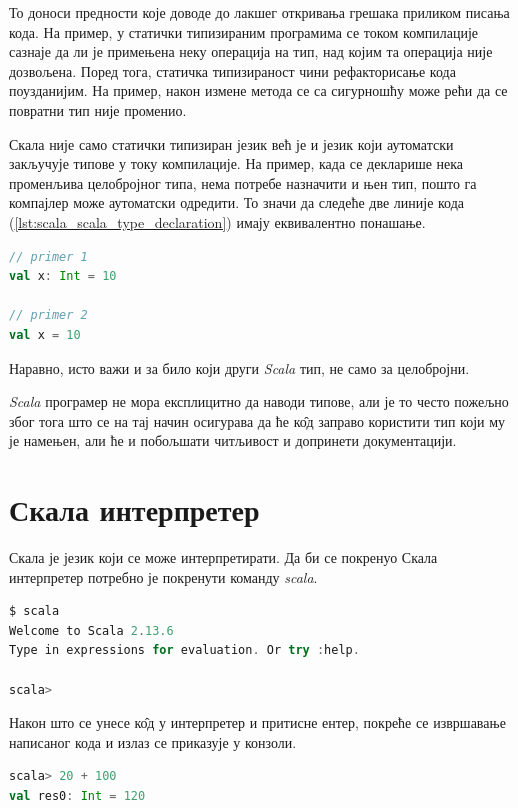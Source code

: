 \documentclass[12pt,oneside]{memoir}
\begin{document}
То доноси предности које доводе до лакшег откривања грешака приликом писања кода. На пример, у статички типизираним програмима се током компилације сазнаје да ли је примењена неку операција на тип, над којим та операција није дозвољена. Поред тога, статичка типизираност чини рефакторисање кода поузданијим. На пример, након измене метода се са сигурношћу може рећи да се повратни тип није променио. \cite{scala_prog}

Скала није само статички типизиран језик већ је и језик који аутоматски закључује типове у току компилације. На пример, када се декларише нека променљива целобројног типа, нема потребе назначити и њен тип, пошто га компајлер може аутоматски одредити. То значи да следеће две линије кода (\ref{lst:scala_scala_type_declaration}) имају еквивалентно понашање.

\begin{lstlisting}[caption={Декларација типова}, language=Scala, label={lst:scala_scala_type_declaration}]
// primer 1
val x: Int = 10

// primer 2
val x = 10
\end{lstlisting}

Наравно, исто важи и за било који други \textit{Scala} тип, не само за целобројни.

\textit{Scala} програмер не мора експлицитно да наводи типове, али је то  често пожељно због тога што се на тај начин осигурава да ће к\^{о}д заправо користити тип који му је намењен, али ће и побољшати читљивост и допринети документацији. \cite{scala_prog}

\section{Скала интерпретер}
\label{sec:scala_interpr}

Скала је језик који се може интерпретирати. Да би се покренуо Скала интерпретер потребно је покренути команду \textit{scala}.

\begin{lstlisting}[language=Scala, caption={Скала интерпретер}, label={lst:scala_scala_interpreter_example}]
$ scala
Welcome to Scala 2.13.6
Type in expressions for evaluation. Or try :help.

scala>
\end{lstlisting}

Након што се унесе к\^{о}д у интерпретер и притисне ентер, покреће се извршавање написаног кода и излаз се приказује у конзоли.

\begin{lstlisting}[language=Scala, caption={Пример кода у интерпретеру}, label={lst:scala_interpreter_code_example}]
scala> 20 + 100
val res0: Int = 120
\end{lstlisting}
\end{document}
